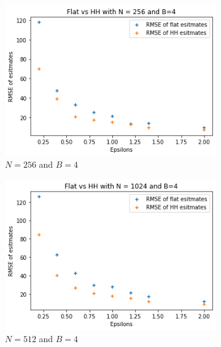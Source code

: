 \documentclass[11pt]{article}
\theoremstyle{definition}
\begin{document}
\begin{figure}[H]
\centering
\begin{subfigure}{.3\textwidth}
  \centering
  \includegraphics[width=\linewidth]{figures/central_hh_flat/hh_beat_flat=256_B=4.png}
  \caption{$N=256$ and $B=4$}
  \label{fig:cen256}
\end{subfigure}%
\begin{subfigure}{.3\textwidth}
  \centering
  \includegraphics[width=\linewidth]{figures/central_hh_flat/hh_beat_flat=1024_B=4.png}
  \caption{$N=512$ and $B=4$}
  \label{fig:cen1024}
\end{subfigure}%
\begin{subfigure}{.3\textwidth}
  \centering

\end{subfigure}
\end{figure}
\end{document}
